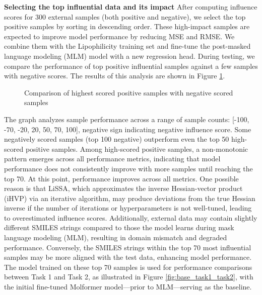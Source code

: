 \documentclass[11pt]{article}
\begin{document}
\textbf{Selecting the top influential data and its impact}
After computing influence scores for 300 external samples (both positive and negative), we select the top positive samples by sorting in descending order. These high-impact samples are expected to improve model performance by reducing MSE and RMSE. We combine them with the Lipophilicity training set and fine-tune the post-masked language modeling (MLM) model with a new regression head. During testing, we compare the performance of top positive influential samples against a few samples with negative scores. The results of this analysis are shown in Figure \ref{fig:task_2_comparison}.

\begin{figure}[htp]
    \centering
    \caption{Comparison of highest scored positive samples with negative scored samples }
    \label{fig:task_2_comparison}
\end{figure}

The graph analyzes sample performance across a range of sample counts: [-100, -70, -20, 20, 50, 70, 100], negative sign indicating negative influence score. Some negatively scored samples (top 100 negative) outperform even the top 50 high-scored positive samples. Among high-scored positive samples, a non-monotonic pattern emerges across all performance metrics, indicating that model performance does not consistently improve with more samples until reaching the top 70. At this point, performance improves across all metrics. One possible reason is that LiSSA, which approximates the inverse Hessian-vector product (iHVP) via an iterative algorithm, may produce deviations from the true Hessian inverse if the number of iterations or hyperparameters is not well-tuned, leading to overestimated influence scores. Additionally, external data may contain slightly different SMILES strings compared to those the model learns during mask language modeling (MLM), resulting in domain mismatch and degraded performance. Conversely, the SMILES strings within the top 70 most influential samples may be more aligned with the test data, enhancing model performance. The model trained on these top 70 samples is used for performance comparisons between Task 1 and Task 2, as illustrated in Figure \ref{fig:base_task1_task2}, with the initial fine-tuned Molformer model—prior to MLM—serving as the baseline.
\end{document}
